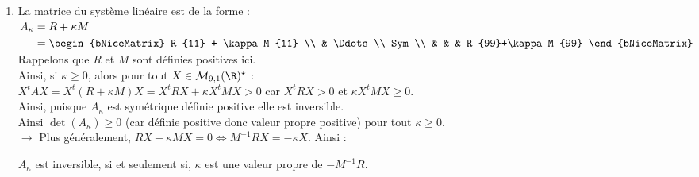 \documentclass[12pt,a4paper]{article}
\begin{document}
\begin{enumerate}
\begin{enumerate}
			  \vspace{.5cm}
	
	\item $R_{11} = \dfrac1{2} \times 1$ \hspace{.5cm} $R_{33} = \dfrac1{2} \times 2$ \hspace{.5cm} $R_{44} = \dfrac12\left(1+1+2\right)$ \hspace{.5cm} $R_{55} = 2\times\dfrac12\left(1+1+2\right)$\\ $R_{66} = \dfrac12\times\left(1+1+2\right)$\\
	$R_{54} = \dfrac1{2} (-1+(-1))$ \hspace{.5cm} $R_{53} = 2\times \dfrac02$ \hspace{.5cm} $R_{75} = 2\times \dfrac02$ \hspace{.5cm} $R_{64} = 0$ \hspace{.5cm} $R_{95} = 0$
	
	\vspace{.5cm}
	\end{enumerate}
	
	\item La matrice du système linéaire est de la forme : $\begin{aligned}[t]
		A_\kappa &= R + \kappa M\\
		&= \begin{bNiceMatrix}
			R_{11} + \kappa M_{11} \\
			 & \Ddots \\
			 Sym \\
			& & & R_{99}+\kappa M_{99}
		\end{bNiceMatrix}
	\end{aligned}$\\
	Rappelons que $R$ et $M$ sont définies positives ici.\\
	Ainsi, si $\kappa \geq 0$, alors pour tout $X \in \mathcal M_{9,1}(\R)^\star$ :\\
	$X^t AX = X^t(R+\kappa M)X = X^tRX + \kappa X^t M X >0$ car $X^tRX > 0$ et $\kappa X^tMX \geq 0$.\\
	Ainsi, puisque $A_\kappa$ est symétrique définie positive elle est inversible.\\
	Ainsi $\det(A_\kappa) \geq 0$ (car définie positive donc valeur propre positive) pour tout $\kappa \geq 0$.\\
	
	$\to$ Plus généralement, $RX+\kappa MX = 0 \iff M^{-1}RX = -\kappa X$. Ainsi :
	\begin{center}
		 $A_\kappa$ est inversible, si et seulement si, $\kappa$ est une valeur propre de $-M^{-1}R$.
	\end{center}
	

\end{enumerate}
\end{document}
